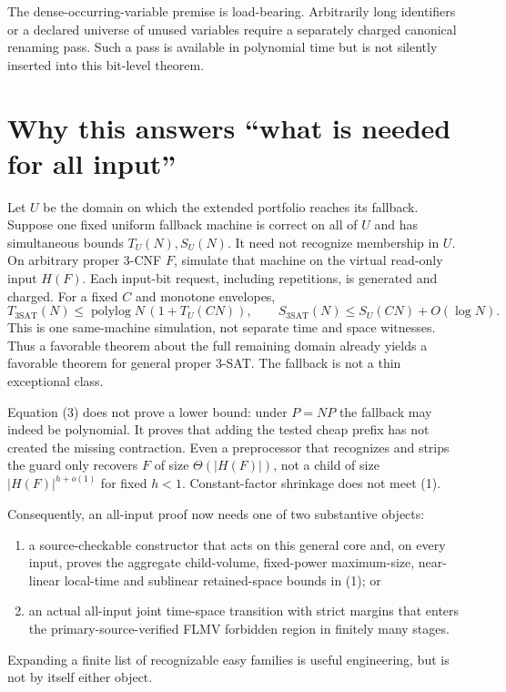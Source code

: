 \documentclass[11pt]{article}
\begin{document}
The dense-occurring-variable premise is load-bearing. Arbitrarily long
identifiers or a declared universe of unused variables require a separately
charged canonical renaming pass. Such a pass is available in polynomial
time but is not silently inserted into this bit-level theorem.

\section{Why this answers ``what is needed for all input''}
Let $U$ be the domain on which the extended portfolio reaches its fallback.
Suppose one fixed uniform fallback machine is correct on all of $U$ and
has simultaneous bounds $T_U(N),S_U(N)$. It need not recognize membership
in $U$. On arbitrary proper 3-CNF $F$, simulate that machine on the virtual
read-only input $H(F)$. Each input-bit request, including repetitions, is
generated and charged. For a fixed $C$ and monotone envelopes,
\[
 T_{3\mathrm{SAT}}(N)
 \le \operatorname{polylog}N\,(1+T_U(CN)),\qquad
 S_{3\mathrm{SAT}}(N)\le S_U(CN)+O(\log N).
 \tag{3}
\]
This is one same-machine simulation, not separate time and space witnesses.
Thus a favorable theorem about the full remaining domain already yields
a favorable theorem for general proper 3-SAT. The fallback is not a thin
exceptional class.

Equation (3) does not prove a lower bound: under $P=NP$ the fallback may
indeed be polynomial. It proves that adding the tested cheap prefix has
not created the missing contraction. Even a preprocessor that recognizes
and strips the guard only recovers $F$ of size $\Theta(|H(F)|)$, not a
child of size $|H(F)|^{h+o(1)}$ for fixed $h<1$. Constant-factor shrinkage
does not meet (1).

Consequently, an all-input proof now needs one of two substantive objects:
\begin{enumerate}
\item a source-checkable constructor that acts on this general core and,
on every input, proves the aggregate child-volume, fixed-power maximum-size,
near-linear local-time and sublinear retained-space bounds in (1); or
\item an actual all-input joint time-space transition with strict margins
that enters the primary-source-verified FLMV forbidden region in finitely
many stages.
\end{enumerate}
Expanding a finite list of recognizable easy families is useful engineering,
but is not by itself either object.
\end{document}
